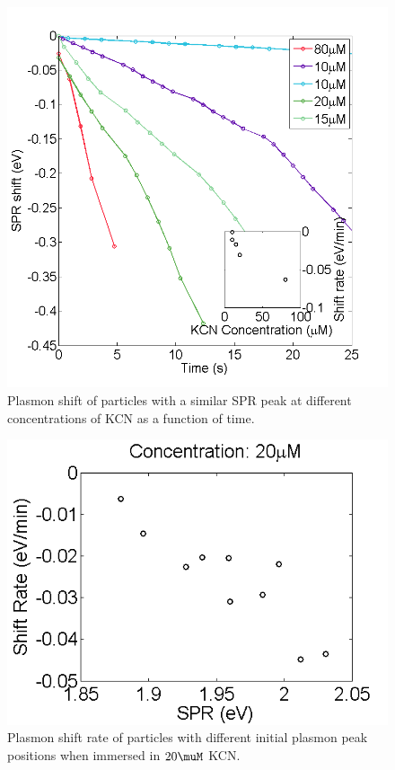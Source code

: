 \documentclass{article}
\begin{document}

\begin{figure}[p]
 \centering
 \includegraphics[width=0.95\linewidth]{shift_different_concentrations.png}
 \caption{Plasmon shift of particles with a similar SPR peak at different
 concentrations of KCN as a function of time.}
 \label{fig:FWHM}
\end{figure}

\begin{figure}[p]
 \centering
 \includegraphics[width=0.95\linewidth]{shift_rate_vs_spr.png}
 \caption{Plasmon shift rate of particles with different initial plasmon peak
 positions when immersed in $20\muM$ KCN.}
 \label{fig:FWHM}
\end{figure}
\end{document}
